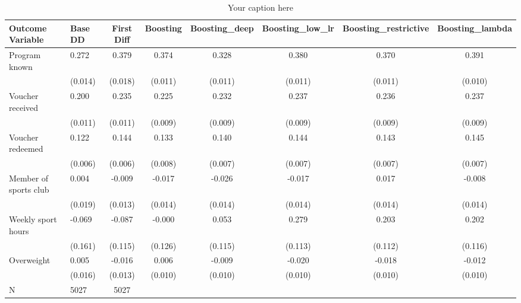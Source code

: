 \begin{sidewaystable*}
\centering
\begin{tabular}{llcccccc}
\hline
Outcome Variable & Base DD & First Diff & Boosting & Boosting_deep & Boosting_low_lr & Boosting_restrictive & Boosting_lambda \\
\hline
Program known & 0.272 & 0.379 & 0.374 & 0.328 & 0.380 & 0.370 & 0.391 \\
  & (0.014) & (0.018) & (0.011) & (0.011) & (0.011) & (0.011) & (0.010) \\
Voucher received & 0.200 & 0.235 & 0.225 & 0.232 & 0.237 & 0.236 & 0.237 \\
  & (0.011) & (0.011) & (0.009) & (0.009) & (0.009) & (0.009) & (0.009) \\
Voucher redeemed & 0.122 & 0.144 & 0.133 & 0.140 & 0.144 & 0.143 & 0.145 \\
  & (0.006) & (0.006) & (0.008) & (0.007) & (0.007) & (0.007) & (0.007) \\
Member of sports club & 0.004 & -0.009 & -0.017 & -0.026 & -0.017 & 0.017 & -0.008 \\
  & (0.019) & (0.013) & (0.014) & (0.014) & (0.014) & (0.014) & (0.014) \\
Weekly sport hours & -0.069 & -0.087 & -0.000 & 0.053 & 0.279 & 0.203 & 0.202 \\
  & (0.161) & (0.115) & (0.126) & (0.115) & (0.113) & (0.112) & (0.116) \\
Overweight & 0.005 & -0.016 & 0.006 & -0.009 & -0.020 & -0.018 & -0.012 \\
  & (0.016) & (0.013) & (0.010) & (0.010) & (0.010) & (0.010) & (0.010) \\
\hline
N & 5027 & 5027  &  &  &  &  \\
\hline
\end{tabular}
\caption{Your caption here}
\label{tab:your_label}
\end{sidewaystable*}